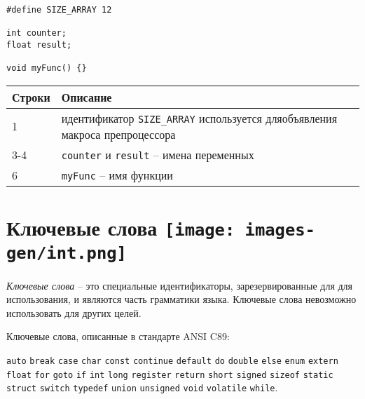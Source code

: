\documentclass[myc.tex]{subfiles}
\begin{document}
\begin{lstlisting}
#define SIZE_ARRAY 12

int counter;
float result;

void myFunc() {}
\end{lstlisting}
\noindent
\begin{small}
\begin{tabularx}{\textwidth}{|l|X|}
\hline
\textbf{Строки} & \textbf{Описание}\\
\hline
1 & идентификатор \texttt{SIZE\_ARRAY} используется для\newline объявления макроса препроцессора\\ %
\hline
3-4 & \texttt{counter} и \texttt{result} -- имена переменных\\
\hline
6 & \texttt{myFunc} -- имя функции\\
\hline
\end{tabularx}
\end{small}


























\section[Ключевые слова]{Ключевые слова \hfill\texttt{[image: images-gen/int.png]}}

\textit{Ключевые слова} -- это специальные идентификаторы, зарезервированные для для использования, и являются часть грамматики языка. Ключевые слова невозможно использовать для других целей.

Ключевые слова, описанные в стандарте ANSI C89:

\noindent
\texttt{auto} \texttt{break} \texttt{case} \texttt{char} \texttt{const} \texttt{continue} \texttt{default} \texttt{do} \texttt{double} \texttt{else} \texttt{enum} \texttt{extern} \texttt{float} \texttt{for} \texttt{goto} \texttt{if} \texttt{int} \texttt{long} \texttt{register} \texttt{return} \texttt{short} \texttt{signed} \texttt{sizeof} \texttt{static} \texttt{struct} \texttt{switch} \texttt{typedef} \texttt{union} \texttt{unsigned} \texttt{void} \texttt{volatile} \texttt{while}.
\end{document}
